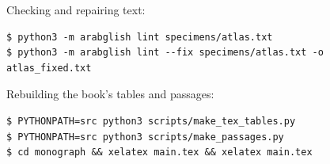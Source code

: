 Checking and repairing text:
\begin{verbatim}
$ python3 -m arabglish lint specimens/atlas.txt
$ python3 -m arabglish lint --fix specimens/atlas.txt -o atlas_fixed.txt
\end{verbatim}

Rebuilding the book's tables and passages:
\begin{verbatim}
$ PYTHONPATH=src python3 scripts/make_tex_tables.py
$ PYTHONPATH=src python3 scripts/make_passages.py
$ cd monograph && xelatex main.tex && xelatex main.tex
\end{verbatim}
